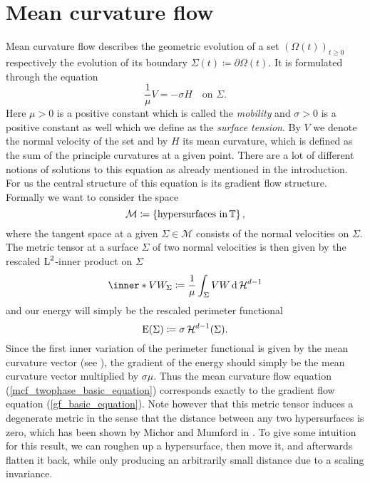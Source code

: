 \section{Mean curvature flow}
	\label{section_mcf}

Mean curvature flow describes the geometric evolution of a set $ ( \Omega ( t ) 
)_{ t \geq 0 } $ respectively the evolution of its boundary $ \Sigma ( t ) 
\coloneqq \partial \Omega ( t ) $. It is formulated through the equation
\begin{equation}
	\label{mcf_twophase_basic_equation}
	\frac{ 1 }{ \mu } V = - \sigma H 
	\quad
	\text{on }
	\Sigma.
\end{equation}
Here $ \mu > 0 $ is a positive constant which is called the \emph{mobility} and 
$ \sigma > 0 $ is a positive constant as well which we define as the 
\emph{surface tension}. By $ V $ we denote the normal velocity of the set and 
by $ H $ its mean curvature, which is defined as the sum of the principle 
curvatures at a given point.
There are a lot of different notions of solutions to this equation as already 
mentioned in the introduction.
For us the central structure of this equation is its gradient flow structure. Formally we want to consider the space
\begin{equation*}
	\mathcal{ M }
	\coloneqq
	\left\{
		\text{hypersurfaces in} \operatorname{\mathbb{T}}
	\right\},
\end{equation*}
where the tangent space at a given $ \Sigma \in \mathcal{ M } $ consists of the normal velocities on $ \Sigma $.
The metric tensor at a surface $ \Sigma $ of two normal velocities is then 
given by the rescaled $ \operatorname{L}^{ 2 } $-inner product on $ \Sigma $
\begin{equation*}
	\inner*{ V }{ W }_{ \Sigma }
	\coloneqq
	\frac{ 1 }{ \mu }
	\int_{ \Sigma }
		V W
	\dd{ \hm^{ d - 1 } }
\end{equation*}
and our energy will simply be the rescaled perimeter functional
\begin{equation*}
	\operatorname{E} ( \Sigma )
	\coloneqq
	\sigma \operatorname{\mathcal{H}}^{ d -1 } ( \Sigma ).
\end{equation*}
Since the first inner variation of the perimeter functional is given by the mean curvature vector (see \cite[Thm.~17.5]{maggi_sets_of_finite_perimeter}), the gradient of the energy should simply be the mean curvature vector multiplied by $ \sigma \mu $.
Thus the mean curvature flow equation (\ref{mcf_twophase_basic_equation}) 
corresponds exactly to the gradient flow equation (\ref{gf_basic_equation}).
Note however that this metric tensor induces a degenerate metric in the sense 
that the distance between any two hypersurfaces is zero, which has been shown 
by Michor and Mumford 
in \cite{michor_mumford_riemannian_geometries_on_spaces_of_plane_curves}. 
To give some intuition for this result, we can roughen up a hypersurface, then 
move it, and 
afterwards flatten 
it back, while only producing an arbitrarily small distance due to a scaling 
invariance.

